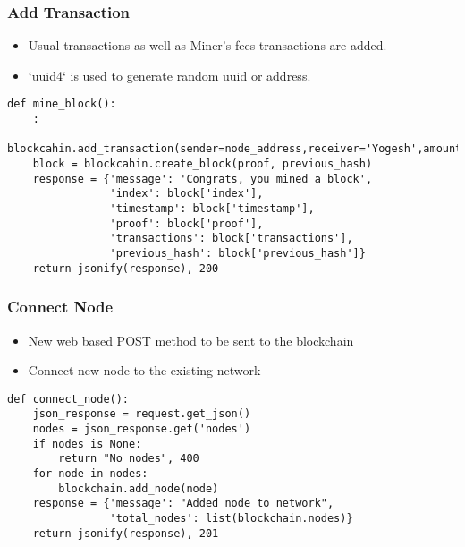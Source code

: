 \begin{frame}[fragile]\frametitle{Add Transaction}
\begin{itemize}
\item Usual transactions as well as Miner's fees transactions are added.
\item `uuid4` is used to generate random uuid or address.
\end{itemize}

\begin{lstlisting}
def mine_block():
    :
    blockcahin.add_transaction(sender=node_address,receiver='Yogesh',amount=1)
    block = blockcahin.create_block(proof, previous_hash)
    response = {'message': 'Congrats, you mined a block',
                'index': block['index'],
                'timestamp': block['timestamp'],
                'proof': block['proof'],
                'transactions': block['transactions'],
                'previous_hash': block['previous_hash']}
    return jsonify(response), 200

\end{lstlisting}
\end{frame}

\begin{frame}[fragile]\frametitle{Connect Node}
\begin{itemize}
\item New web based POST method to be sent to the blockchain
\item Connect new node to the existing network
\end{itemize}

\begin{lstlisting}
def connect_node():
    json_response = request.get_json()
    nodes = json_response.get('nodes')
    if nodes is None:
        return "No nodes", 400
    for node in nodes:
        blockchain.add_node(node)
    response = {'message': "Added node to network",
                'total_nodes': list(blockchain.nodes)}
    return jsonify(response), 201

\end{lstlisting}
\end{frame}


